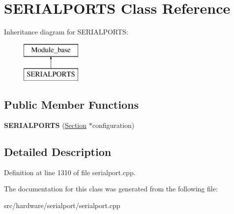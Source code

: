 \hypertarget{classSERIALPORTS}{\section{S\-E\-R\-I\-A\-L\-P\-O\-R\-T\-S Class Reference}
\label{classSERIALPORTS}
}
Inheritance diagram for S\-E\-R\-I\-A\-L\-P\-O\-R\-T\-S\-:\begin{figure}[H]
\begin{center}
\leavevmode
\includegraphics[height=2.000000cm]{classSERIALPORTS}
\end{center}
\end{figure}
\subsection*{Public Member Functions}
\begin{DoxyCompactItemize}
\item 
\hypertarget{classSERIALPORTS_a36570726a1e10f60d8d7be830141f465}{{\bfseries S\-E\-R\-I\-A\-L\-P\-O\-R\-T\-S} (\hyperlink{classSection}{Section} $\ast$configuration)}\label{classSERIALPORTS_a36570726a1e10f60d8d7be830141f465}

\end{DoxyCompactItemize}


\subsection{Detailed Description}


Definition at line 1310 of file serialport.\-cpp.



The documentation for this class was generated from the following file\-:\begin{DoxyCompactItemize}
\item 
src/hardware/serialport/serialport.\-cpp\end{DoxyCompactItemize}

